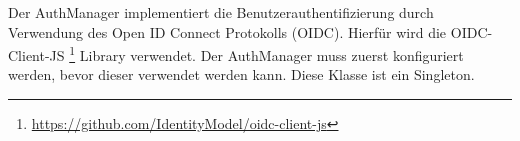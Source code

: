 Der AuthManager implementiert die Benutzerauthentifizierung durch Verwendung des Open ID Connect Protokolls (OIDC).
Hierfür wird die OIDC-Client-JS \footnote{\href{https://github.com/IdentityModel/oidc-client-js}{https://github.com/IdentityModel/oidc-client-js}} Library verwendet.
Der AuthManager muss zuerst konfiguriert werden, bevor dieser verwendet werden kann.
Diese Klasse ist ein Singleton.